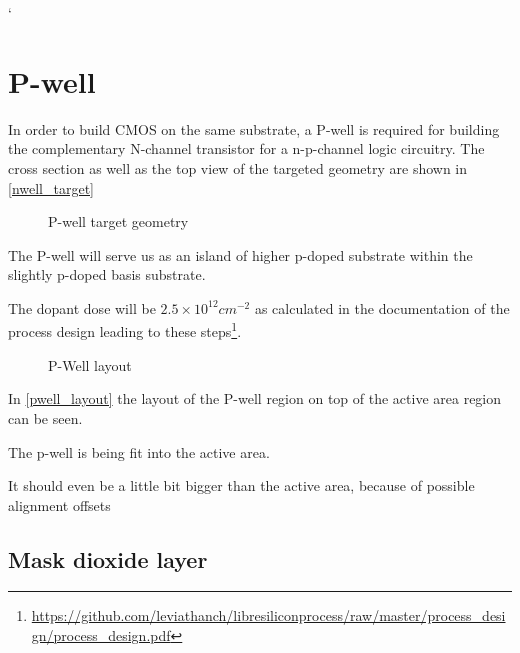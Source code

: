 `\section{P-well}\label{pwell_chapter}
In order to build CMOS on the same substrate, a P-well is required for building the complementary N-channel transistor for a n-p-channel logic circuitry.
The cross section as well as the top view of the targeted geometry are shown in \autoref{nwell_target}
\begin{figure}[H]
	\centering
	\begin{tikzpicture}[node distance = 3cm, auto, thick,scale=\CrossAndTopSectionBig, every node/.style={transform shape}]
		
	\end{tikzpicture}
	\begin{tikzpicture}[node distance = 3cm, auto, thick,scale=\CrossAndTopSectionBig, every node/.style={transform shape}]
		
	\end{tikzpicture}
	\caption{P-well target geometry}
	\label{pwell_target}
\end{figure}
The P-well will serve us as an island of higher p-doped substrate within the slightly p-doped basis substrate.

The dopant dose will be $2.5\times10^{12}cm^{-2}$ as calculated in the documentation of the process design leading to these steps\footnote{\url{https://github.com/leviathanch/libresiliconprocess/raw/master/process_design/process_design.pdf}}.

\begin{figure}[H]
	\centering
	\begin{tikzpicture}[node distance =1cm, auto, thick,scale=\VLSILayout, every node/.style={transform shape}]
		
	\end{tikzpicture}
	\caption{P-Well layout}
	\label{pwell_layout}
\end{figure}

In \autoref{pwell_layout} the layout of the P-well region on top of the active area region can be seen.

The p-well is being fit into the active area.

It should even be a little bit bigger than the active area, because of possible alignment offsets

\newpage

\subsection{Mask dioxide layer}

